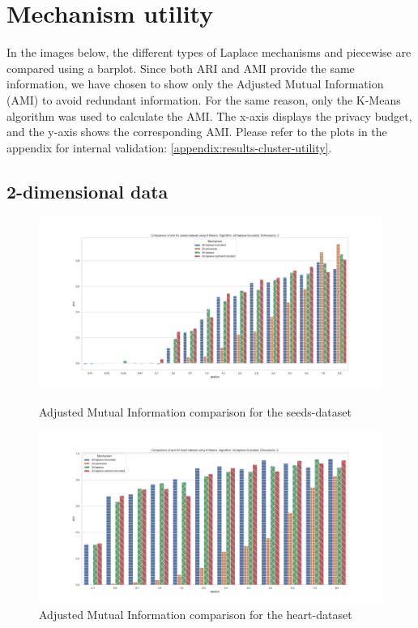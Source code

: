 \section{Mechanism utility}
In the images below, the different types of Laplace mechanisms and piecewise are compared using a barplot.
Since both ARI and AMI provide the same information, we have chosen to show only the Adjusted Mutual Information (AMI) to avoid redundant information. For the same reason, only the K-Means algorithm was used to calculate the AMI.
The x-axis displays the privacy budget, and the y-axis shows the corresponding AMI.
Please refer to the plots in the appendix for internal validation: \ref{appendix:results-cluster-utility}.

\subsection{2-dimensional data}
\begin{figure}[H]
    \centering
    \begin{minipage}[c]{0.8\textwidth}
        \includegraphics[width=1\textwidth]{Results/RQ1/seeds-dataset/ami_seeds-dataset_comparison.png}
        \caption{Adjusted Mutual Information comparison for the seeds-dataset}
        \label{fig:ami_seeds-dataset_comparison_2d}
    \end{minipage}
    \begin{minipage}[c]{0.8\textwidth}
        \includegraphics[width=1\textwidth]{Results/RQ1/heart-dataset/ami_heart-dataset_comparison.png}
        \caption{Adjusted Mutual Information comparison for the heart-dataset}
        \label{fig:ami_heart-dataset_comparison_2d}
    \end{minipage}

\end{figure}


